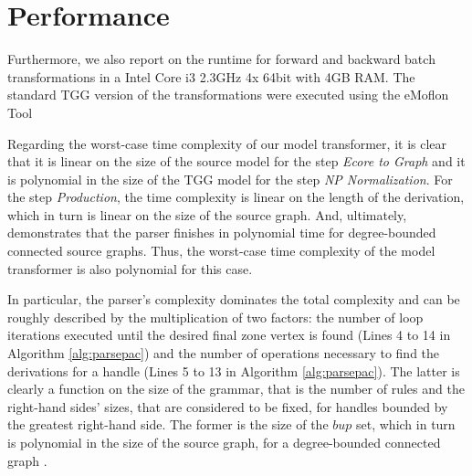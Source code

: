 

\section{Performance}
Furthermore, we also report on the runtime for forward and backward batch transformations in a Intel Core i3 2.3GHz 4x 64bit with 4GB RAM. The standard TGG version of the transformations were executed using the eMoflon Tool %

Regarding the worst-case time complexity of our model transformer, it is clear that it is linear on the size of the source model for the step \emph{Ecore to Graph} and it is polynomial in the size of the TGG model for the step \emph{NP Normalization}. For the step \emph{Production}, the time complexity is linear on the length of the derivation, which in turn is linear on the size of the source graph. And, ultimately, \cite[p. 160]{rozenberg1986boundary} demonstrates that the parser finishes in polynomial time for degree-bounded connected source graphs. Thus, the worst-case time complexity of the model transformer is also polynomial for this case.

In particular, the parser's complexity dominates the total complexity and can be roughly described by the multiplication of two factors: the number of loop iterations executed until the desired final zone vertex is found (Lines 4 to 14 in Algorithm \ref{alg:parsepac}) and the number of operations necessary to find the derivations for a handle (Lines 5 to 13 in Algorithm \ref{alg:parsepac}). The latter is clearly a function on the size of the grammar, that is the number of rules and the right-hand sides' sizes, that are considered to be fixed, for handles bounded by the greatest right-hand side. The former is the size of the $bup$ set, which in turn is polynomial in the size of the source graph, for a degree-bounded connected graph \cite[p. 161]{rozenberg1986boundary}.

